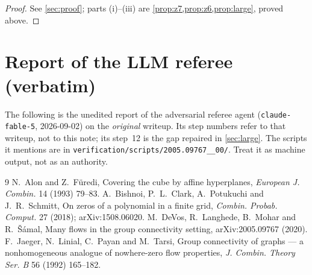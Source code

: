 \documentclass[11pt,a4paper]{article}
\theoremstyle{plain}
\theoremstyle{definition}
\theoremstyle{remark}
\begin{document}
\label{pf:main}
\thmmain*
\begin{proof}
See \cref{sec:proof}; parts (i)--(iii) are \cref{prop:z7,prop:z6,prop:large}, proved above.
\end{proof}

\section{Report of the LLM referee (verbatim)}\label{app:referee}

\begin{tcolorbox}[colback=gray!8,colframe=gray!50,boxrule=0.4pt,arc=2pt]
\small The following is the unedited report of the adversarial referee agent (\texttt{claude-fable-5}, 2026-09-02) on the \emph{original} writeup. Its step numbers refer to that writeup, not to this note; its step~12 is the gap repaired in \cref{sec:large}. The scripts it mentions are in \texttt{verification/scripts/2005.09767\_\_00/}. Treat it as machine output, not as an authority.
\end{tcolorbox}



\begin{thebibliography}{9}
 N.~Alon and Z.~Füredi, Covering the cube by affine hyperplanes, \emph{European J. Combin.} 14 (1993) 79--83.
 A.~Bishnoi, P.~L.~Clark, A.~Potukuchi and J.~R.~Schmitt, On zeros of a polynomial in a finite grid, \emph{Combin. Probab. Comput.} 27 (2018); arXiv:1508.06020.
 M.~DeVos, R.~Langhede, B.~Mohar and R.~Šámal, Many flows in the group connectivity setting, arXiv:2005.09767 (2020).
 F.~Jaeger, N.~Linial, C.~Payan and M.~Tarsi, Group connectivity of graphs --- a nonhomogeneous analogue of nowhere-zero flow properties, \emph{J. Combin. Theory Ser. B} 56 (1992) 165--182.
\end{thebibliography}
\end{document}
